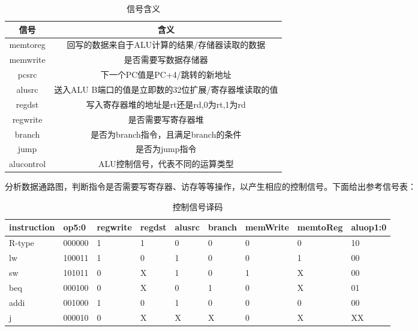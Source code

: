 \begin{table}[htbp]
    \centering
    \begin{tabular}{c|c}
         信号&	含义 \\ \hline
        memtoreg&	回写的数据来自于ALU计算的结果/存储器读取的数据\\
        memwrite&	是否需要写数据存储器\\
        pcsrc&	下一个PC值是PC+4/跳转的新地址\\
        alusrc&	送入ALU B端口的值是立即数的32位扩展/寄存器堆读取的值\\
        regdst&	写入寄存器堆的地址是rt还是rd,0为rt,1为rd\\
        regwrite&	是否需要写寄存器堆\\
        branch&	是否为branch指令，且满足branch的条件\\
        jump&	是否为jump指令\\
        alucontrol&	ALU控制信号，代表不同的运算类型\\ \hline

    \end{tabular}
    \caption{信号含义}
    \label{tab:sig_meaning}
\end{table}

\newpage

分析数据通路图，判断指令是否需要写寄存器、访存等等操作，以产生相应的控制信号。下面给出参考信号表：

\begin{table}[htbp]
    \centering
    \begin{tabular}{l|l|l|l|l|l|l|l|l}
         instruction&	op5:0&	regwrite&	regdst&	alusrc&	branch&	memWrite&	memtoReg&	aluop1:0\\ \hline
        R-type&	000000&	1&	1&	0&	0&	0&	0&	10\\
        lw&	100011&	1&	0&	1&	0&	0&	1&	00\\
        sw&	101011&	0&	X&	1&	0&	1&	X&	00\\
        beq&	000100&	0&	X&	0&	1&	0&	X&	01\\
        addi&	001000&	1&	0&	1&	0&	0&	0&	00\\
        j&	000010&	0&	X&	X&	X&	0&	X&	XX \\ \hline
 
    \end{tabular}
    \caption{控制信号译码}
    \label{tab:controller_decode}
\end{table}
